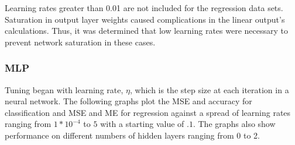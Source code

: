\documentclass[twoside,11pt]{article}
\begin{document}
Learning rates greater than 0.01 are not included for the regression data sets. Saturation in output layer weights caused complications in the linear output's calculations. Thus, it was determined that low learning rates were necessary to prevent network saturation in these cases.


\subsubsection{MLP}
Tuning began with learning rate, $\eta$, which is the step size at each iteration in a neural network. The following graphs plot the MSE and accuracy for classification and MSE and ME for regression against a spread of learning rates ranging from $1*10^{-4}$ to $5$ with a starting value of $.1$. The graphs also show performance on different numbers of hidden layers ranging from 0 to 2. \\
\end{document}
